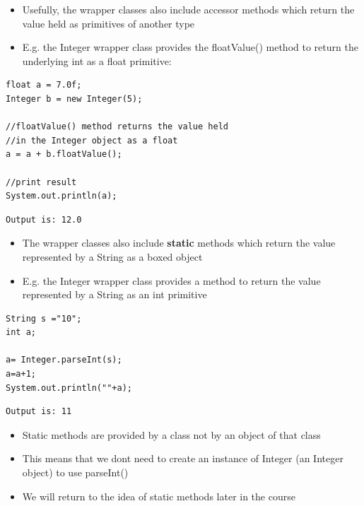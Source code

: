 \documentclass{beamer}
\begin{document}
\begin{frame}[fragile]
\begin{itemize}
\item Usefully, the wrapper classes also include accessor methods which return the value held as primitives of another type
\item E.g. the Integer wrapper class provides the floatValue() method to return the underlying int as a float primitive:
\end{itemize}

\begin{block}{}
\begin{lstlisting}
float a = 7.0f;
Integer b = new Integer(5);

//floatValue() method returns the value held 
//in the Integer object as a float
a = a + b.floatValue();

//print result
System.out.println(a);
\end{lstlisting}
\end{block}

\begin{block}{}
\begin{lstlisting}
Output is: 12.0

\end{lstlisting}
\end{block}
\end{frame}

\begin{frame}[fragile]
\begin{itemize}
\item The wrapper classes also include \textbf{static} methods which return the value represented by a String as a boxed object
\item E.g. the Integer wrapper class provides a method to return the value represented by a String as an int primitive
\end{itemize}

\begin{block}{}
\begin{lstlisting}
String s ="10";
int a;

a= Integer.parseInt(s); 
a=a+1;
System.out.println(""+a);

\end{lstlisting}
\end{block}

\begin{block}{}
\begin{lstlisting}
Output is: 11

\end{lstlisting}
\end{block}
\begin{itemize}
\item Static methods are provided by a class not by an object of that class
\item This means that we dont need to create an instance of Integer (an Integer object) to use parseInt()
\item We will return to the idea of static methods later in the course
\end{itemize}
\end{frame}
\end{document}
